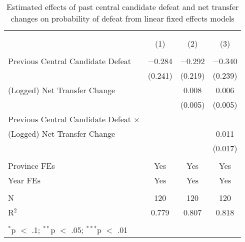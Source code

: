 
\begin{table}[!htbp] \centering 
  \caption{Estimated effects of past central candidate defeat and net transfer changes
          on probability of defeat from linear fixed effects models} 
  \label{tab:lfe_repeat} 
\begin{tabular}{@{\extracolsep{5pt}}lccc} 
\\[-1.8ex]\hline 
\hline \\[-1.8ex] 
\\[-1.8ex] & (1) & (2) & (3)\\ 
\hline \\[-1.8ex] 
 Previous Central Candidate Defeat & $-$0.284 & $-$0.292 & $-$0.340 \\ 
  & (0.241) & (0.219) & (0.239) \\ 
  (Logged) Net Transfer Change &  & 0.008 & 0.006 \\ 
  &  & (0.005) & (0.005) \\ 
  Previous Central Candidate Defeat $\times$ \\ (Logged) Net Transfer Change &  &  & 0.011 \\ 
  &  &  & (0.017) \\ 
 \hline \\[-1.8ex] 
Province FEs & Yes & Yes & Yes \\ 
Year FEs & Yes & Yes & Yes \\ 
\hline \\[-1.8ex] 
N & 120 & 120 & 120 \\ 
R$^{2}$ & 0.779 & 0.807 & 0.818 \\ 
\hline 
\hline \\[-1.8ex] 
\multicolumn{4}{l}{$^{*}$p $<$ .1; $^{**}$p $<$ .05; $^{***}$p $<$ .01} \\ 
\end{tabular} 
\end{table} 
